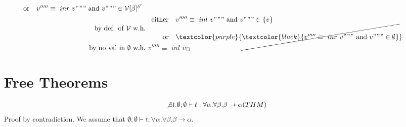 \documentclass{article}
\begin{document}
\begin{align*}
\begin{array}{rl}
    \text{or} & v'''''\equiv \inr v""" \AND v"""\in\V[\beta]^{\delta'}\end{array} \\
        \text{by def. of $\V$ w.h.}  &\ \begin{array}{rl}\text{either}&v'''''\equiv \inl v""" \AND v"""\in \{v\} \\
        \text{or} & \textcolor{purple}{\cancel{\textcolor{black}{v'''''\equiv \inr v""" \AND v"""\in \emptyset}}}\end{array} \\
            \text{by no val in $\emptyset$ w.h.} &\ v'''''\equiv \inl v _\square\\
        \end{align*}

\newpage
\section{Free Theorems}
\begin{gather*}
    \not\exists t. \emptyset;\emptyset\vdash t: \forall\alpha.\forall\beta.\beta\to\alpha (THM)
\end{gather*}
Proof by contradiction. We assume that $\emptyset;\emptyset\vdash t: \forall\alpha.\forall\beta.\beta\to\alpha$.
\end{document}
